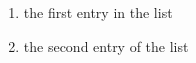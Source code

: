 \documentclass[a4paper]{article}
\begin{document}

\begin{enumerate}
	\item the first entry in the list
	\item the second entry of the list
\end{enumerate}
\end{document}
